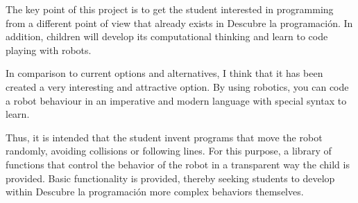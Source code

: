 %



The key point of this project is to get the student interested in programming from a different point of view that already exists in Descubre la programación. In addition, children will develop its computational thinking and learn to code playing with robots.



In comparison to current options and alternatives, I think that it has been created a very interesting and attractive option. By using robotics, you can code a robot behaviour in an imperative and modern language with special syntax to learn.

Thus, it is intended that the student invent programs that move the robot randomly, avoiding collisions or following lines. For this purpose, a library of functions that control the behavior of the robot in a transparent way the child is provided. Basic functionality is provided, thereby seeking students to develop within Descubre la programación more complex behaviors themselves. 
